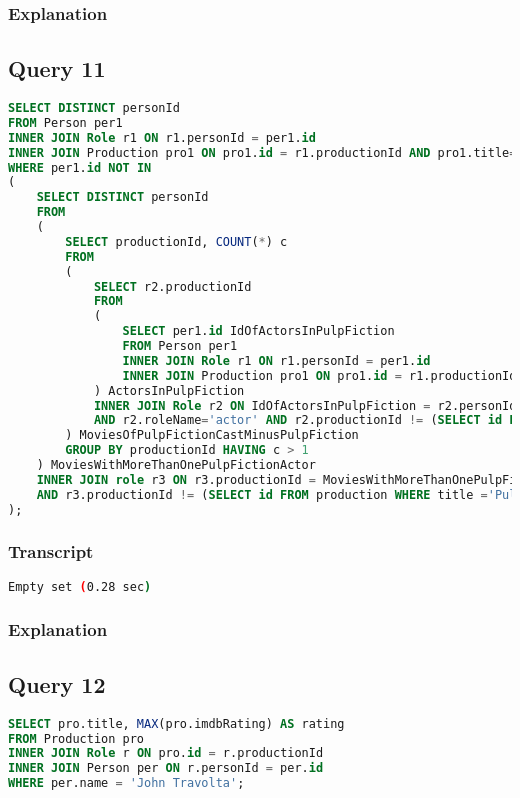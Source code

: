 \subsubsection{Explanation}


\subsection{Query 11}
\begin{lstlisting}[language=sql]
SELECT DISTINCT personId
FROM Person per1 
INNER JOIN Role r1 ON r1.personId = per1.id
INNER JOIN Production pro1 ON pro1.id = r1.productionId AND pro1.title='Pulp Fiction' AND r1.roleName='actor'
WHERE per1.id NOT IN 
( 
    SELECT DISTINCT personId
    FROM 
    (
        SELECT productionId, COUNT(*) c
        FROM
        (
            SELECT r2.productionId 
            FROM
            (
                SELECT per1.id IdOfActorsInPulpFiction
                FROM Person per1
                INNER JOIN Role r1 ON r1.personId = per1.id
                INNER JOIN Production pro1 ON pro1.id = r1.productionId AND pro1.title='Pulp Fiction' AND r1.roleName='actor'         
            ) ActorsInPulpFiction
            INNER JOIN Role r2 ON IdOfActorsInPulpFiction = r2.personId
            AND r2.roleName='actor' AND r2.productionId != (SELECT id FROM production WHERE title ='Pulp Fiction')
        ) MoviesOfPulpFictionCastMinusPulpFiction
        GROUP BY productionId HAVING c > 1
    ) MoviesWithMoreThanOnePulpFictionActor 
    INNER JOIN role r3 ON r3.productionId = MoviesWithMoreThanOnePulpFictionActor.productionId
    AND r3.productionId != (SELECT id FROM production WHERE title ='Pulp Fiction')
);
\end{lstlisting}

\subsubsection{Transcript}
\begin{lstlisting}[language=bash]
Empty set (0.28 sec)
\end{lstlisting}

\subsubsection{Explanation}


\subsection{Query 12}
\begin{lstlisting}[language=sql]
SELECT pro.title, MAX(pro.imdbRating) AS rating
FROM Production pro
INNER JOIN Role r ON pro.id = r.productionId
INNER JOIN Person per ON r.personId = per.id
WHERE per.name = 'John Travolta';
\end{lstlisting}


